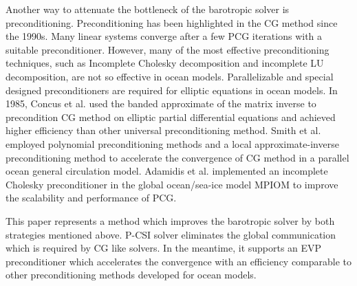 Another way to attenuate the bottleneck of the barotropic solver is preconditioning.
Preconditioning has been highlighted in the CG method since the 1990s. Many linear systems converge after a few PCG iterations with a suitable preconditioner.  
However, many of the most effective preconditioning techniques, such as Incomplete Cholesky decomposition and incomplete LU decomposition, are not so effective in ocean models.  
Parallelizable and special designed preconditioners are required for elliptic equations in ocean models. 
In 1985, Concus et al. \cite{concus1985block} used the banded approximate of the matrix inverse to precondition CG method on elliptic partial differential equations and achieved higher efficiency than other universal preconditioning method. 
Smith et al. \cite{smith1992parallel} employed polynomial preconditioning methods and a local approximate-inverse preconditioning method to accelerate the convergence of CG method in a parallel ocean general circulation model. 
Adamidis et al. \cite{adamidis2011high} implemented an incomplete Cholesky preconditioner in the global ocean/sea-ice model MPIOM to improve the scalability and performance of PCG.

This paper represents a method which improves the barotropic solver by both strategies mentioned above.  P-CSI solver eliminates the global communication which is required by CG like solvers. In the meantime, it supports an EVP preconditioner which accelerates the convergence with an efficiency comparable to other preconditioning methods developed for ocean models. 


